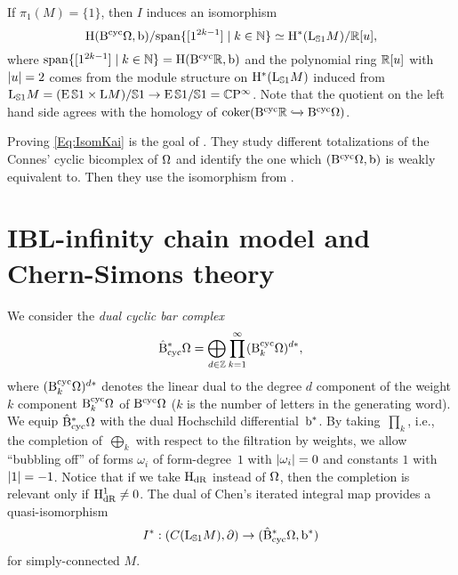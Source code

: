 \documentclass[\MainFolder/Text.tex]{subfiles}
\begin{document}
If $\pi_1(M) = \{1\}$, then $I$ induces an isomorphism 
\begin{equation}\label{Eq:IsomKai}
\mathrm{H}(\mathrm{B}^{\mathrm{cyc}} \Omega,\mathrm{b})/\mathrm{span}\{[1^{2k-1}]\mid k\in\mathbb{N}\} \simeq \mathrm{H}^*(\mathrm{L}_{\mathbb{S}{1}} M)/\mathbb{R}[u],
\end{equation}
where $\mathrm{span}\{[1^{2k-1}]\mid k\in\mathbb{N}\} = \mathrm{H}(\mathrm{B}^{\mathrm{cyc}} \mathbb{R},\mathrm{b})$ and the polynomial ring $\mathbb{R}[u]$ with $|u| = 2$ comes from the module structure on $\mathrm{H}^*(\mathrm{L}_{\mathbb{S}{1}} M)$ induced from $\mathrm{L}_{\mathbb{S}{1}} M = (\operatorname{E} \mathbb{S}{1} \times \mathrm{L} M)/\mathbb{S}{1} \rightarrow \operatorname{E}\mathbb{S}{1}/\mathbb{S}{1} = \mathbb{C}\mathrm{P}^{\infty}$.
Note that the quotient on the left hand side agrees with the homology of $\operatorname{\mathrm{coker}}(\mathrm{B}^{\mathrm{cyc}} \mathbb{R} \xhookrightarrow{} \mathrm{B}^{\mathrm{cyc}} \Omega)$.

Proving \eqref{Eq:IsomKai} is the goal of \cite{Cieliebak2018b}.
They study different totalizations of the Connes' cyclic bicomplex of $\Omega$ and identify the one which $(\mathrm{B}^{\mathrm{cyc}} \Omega,\mathrm{b})$ is weakly equivalent to.
Then they use the isomorphism from \cite{Getzler}.

\section{IBL-infinity chain model and Chern-Simons theory}

We consider the \emph{dual cyclic bar complex}
\[ \hat{\mathrm{B}}_{\mathrm{cyc}}^* \Omega = \bigoplus_{d\in\mathbb{Z}} \prod_{k=1}^\infty (\mathrm{B}^{\mathrm{cyc}}_k \Omega)^{d*}, \]
where $(\mathrm{B}^{\mathrm{cyc}}_k \Omega)^{d*}$ denotes the linear dual to the degree $d$ component of the weight $k$ component $\mathrm{B}^{\mathrm{cyc}}_k \Omega$ of $\mathrm{B}^{\mathrm{cyc}} \Omega$ ($k$ is the number of letters in the generating word).
We equip $\hat{\mathrm{B}}_{\mathrm{cyc}}^* \Omega$ with the dual Hochschild differential~$\mathrm{b}^*$.
By taking~$\prod_k$, i.e., the completion of~$\bigoplus_k$ with respect to the filtration by weights, we allow ``bubbling off'' of forms $\omega_i$ of form-degree~$1$ with $|\omega_i|=0$ and constants $1$ with $|1| = -1$.
Notice that if we take $\mathrm{H}_{\mathrm{dR}}$ instead of $\Omega$, then the completion is relevant only if $\mathrm{H}_{\mathrm{dR}}^1 \neq 0$.
The dual of Chen's iterated integral map provides a quasi-isomorphism
\[I^*: (C(\mathrm{L}_{\mathbb{S}{1}} M),\partial) \rightarrow (\hat{\mathrm{B}}_{\mathrm{cyc}}^*\Omega,\mathrm{b}^*) \]
for simply-connected $M$.
\end{document}
